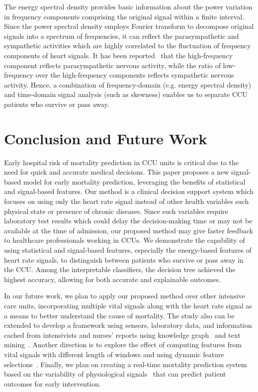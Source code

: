 \documentclass[3p]{elsarticle}
\begin{document}
The energy spectral density provides basic information about the power variation in frequency components comprising the original signal within a finite interval. Since the power spectral density employs Fourier transform to decompose original signals into a spectrum of frequencies, it can reflect the parasympathetic and sympathetic activities which are highly correlated to the fluctuation of frequency components of heart signals. It has been reported~\cite{hasegawa_assessment_2015} that the high-frequency component reflects parasympathetic nervous activity, while the ratio of low-frequency over the high-frequency components reflects sympathetic nervous activity. Hence, a combination of frequency-domain (e.g. energy spectral density) and time-domain signal analysis (such as skewness) enables us to separate CCU patients who survive or pass away.

\section{Conclusion and Future Work}
  \label{sec:conclusion}
Early hospital risk of mortality prediction in CCU units is critical due to the need for quick and accurate medical decisions. This paper proposes a new signal-based model for early mortality prediction, leveraging the benefits of statistical and signal-based features. Our method is a clinical decision support system which focuses on using only the heart rate signal instead of other health variables such physical state or presence of chronic diseases. Since such variables require laboratory test results which could delay the decision-making time or may not be available at the time of admission, our proposed method may give faster feedback to healthcare professionals working in CCUs. We demonstrate the capability of using statistical and signal-based features, especially the energy-based features of heart rate signals, to distinguish between patients who survive or pass away in the CCU. Among the interpretable classifiers, the decision tree achieved the highest accuracy, allowing for both accurate and explainable outcomes.
 
In our future work, we plan to apply our proposed method over other intensive care units, incorporating multiple vital signals along with the heart rate signal as a means to better understand the cause of mortality. The study also can be extended to develop a framework using sensors, laboratory data, and information cached from intensivists and nurses' reports using  knowledge graph~\cite{shekarpour_rquery:_2017} and text mining~\cite{allahyari_brief_2017}. Another direction is to explore the effect of computing features from vital signals with different length of windows and using dynamic feature selections~\cite{zabihimayvan_soft_2017}\cite{hamidzadeh_detection_2018}. Finally, we plan on creating a real-time mortality prediction system based on the variability of physiological signals~\cite{kaffashi_variability_2007} that can predict patient outcomes for early intervention.
\end{document}
